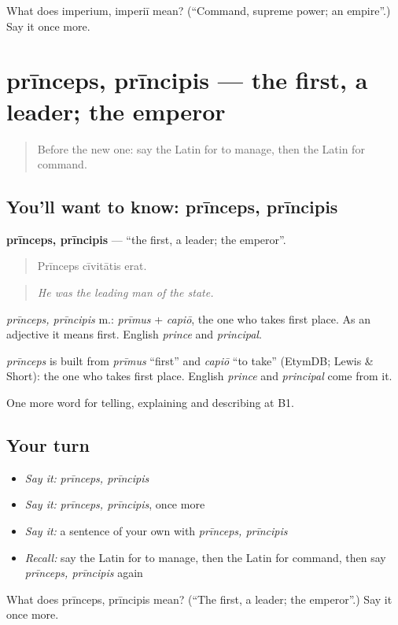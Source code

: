 \begin{tcolorbox}[breakable,colback=teal!4,colframe=teal!35!black,title={Before you move on}]
What does imperium, imperiī mean? (\textquotedblleft{}Command, supreme power; an empire\textquotedblright{}.) Say it once more.
\end{tcolorbox}
\section[prīnceps, prīncipis]{prīnceps, prīncipis — the first, a leader; the emperor}

\label{lesson:LA-C385-princeps}



\begin{quote}
Before the new one: say the Latin for to manage, then the Latin for command.
\end{quote}

\subsection*{You'll want to know: prīnceps, prīncipis}
\textbf{prīnceps, prīncipis} — \textquotedblleft{}the first, a leader; the emperor\textquotedblright{}.

\begin{quote}
Prīnceps cīvitātis erat.
\end{quote}

\begin{quote}
\emph{He was the leading man of the state.}
\end{quote}

\emph{prīnceps, prīncipis} m.: \emph{prīmus} + \emph{capiō}, the one who takes first place. As an adjective it means first. English \emph{prince} and \emph{principal}.

\begin{cousinweb}
\emph{prīnceps} is built from \emph{prīmus} \textquotedblleft{}first\textquotedblright{} and \emph{capiō} \textquotedblleft{}to take\textquotedblright{} (EtymDB; Lewis \& Short): the one who takes first place. English \emph{prince} and \emph{principal} come from it.
\end{cousinweb}

\begin{grammarlens}[title={What you've built}]
One more word for telling, explaining and describing at B1.
\end{grammarlens}

\subsection*{Your turn}
\begin{itemize}
\raggedright
  \item \emph{Say it:} \emph{prīnceps, prīncipis}
  \item \emph{Say it:} \emph{prīnceps, prīncipis}, once more
  \item \emph{Say it:} a sentence of your own with \emph{prīnceps, prīncipis}
  \item \emph{Recall:} say the Latin for to manage, then the Latin for command, then say \emph{prīnceps, prīncipis} again
\end{itemize}

\begin{tcolorbox}[breakable,colback=teal!4,colframe=teal!35!black,title={Before you move on}]
What does prīnceps, prīncipis mean? (\textquotedblleft{}The first, a leader; the emperor\textquotedblright{}.) Say it once more.
\end{tcolorbox}
